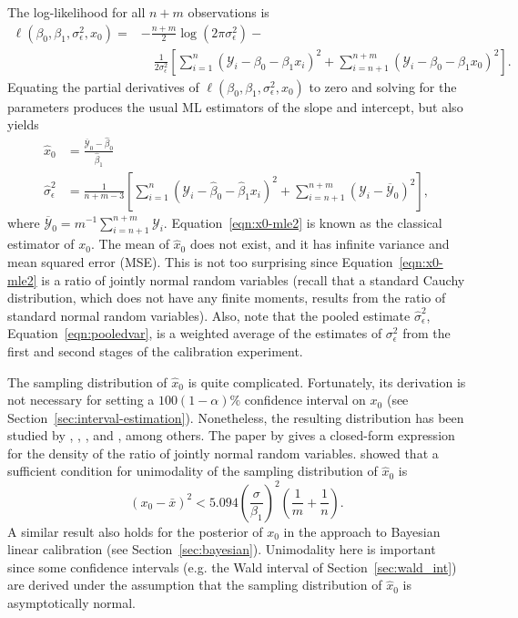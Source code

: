 \documentclass[cmfont,usenames,dvipsnames,leqno]{afit-etd}\usepackage[]{graphicx}\usepackage[]{color}
\newcommand{\mc}[1]{\ensuremath{\mathcal{#1}}}
\newcommand{\wh}[1]{\ensuremath{\widehat{#1}}}
\newcommand{\wb}[1]{\ensuremath{\overline{#1}}}
\begin{document}
The log-likelihood for all $n + m$ observations is
\begin{equation*}
\begin{split}
  \ell\left(\beta_0, \beta_1, \sigma_\epsilon^2, x_0\right) = &-\frac{n+m}{2}\log(2\pi\sigma_\epsilon^2)-\\ &\quad \frac{1}{2\sigma_\epsilon^2}\left[\sum_{i=1}^n(\mc{Y}_i-\beta_0-\beta_1x_i)^2 + \sum_{i=n+1}^{n+m}(\mc{Y}_i-\beta_0-\beta_1x_0)^2\right].
\end{split}
\end{equation*}
Equating the partial derivatives of $\ell\left(\beta_0, \beta_1, \sigma_\epsilon^2, x_0\right)$ to zero and solving for the parameters produces the usual ML estimators of the slope and intercept, but also yields
\begin{align}
  \wh{x}_0 &= \frac{\wb{\mc{Y}}_0-\wh{\beta}_0}{\wh{\beta}_1} \label{eqn:x0-mle2} \\
  \wh{\sigma}_\epsilon^2 &= \frac{1}{n+m-3}\left[\sum_{i=1}^n\left(\mc{Y}_i-\wh{\beta}_0-\wh{\beta}_1 x_i\right)^2 + \sum_{i=n+1}^{n+m}\left(\mc{Y}_i-\wb{\mc{Y}}_0\right)^2\right] \label{eqn:pooledvar},
\end{align}
where $\wb{\mc{Y}}_0 = m^{-1}\sum_{i=n+1}^{n+m}\mc{Y}_i$. Equation~\eqref{eqn:x0-mle2} is known as the classical estimator of $x_0$. The mean of $\wh{x}_0$ does not exist, and it has infinite variance and mean squared error (MSE). This is not too surprising since Equation~\eqref{eqn:x0-mle2} is a ratio of jointly normal random variables (recall that a standard Cauchy distribution, which does not have any finite moments, results from the ratio of standard normal random variables). Also, note that the pooled estimate $\wh{\sigma}_\epsilon^2$, Equation~\eqref{eqn:pooledvar}, is a weighted average of the estimates of $\sigma_\epsilon^2$ from the first and second stages of the calibration experiment. 

The sampling distribution of $\wh{x}_0$ is quite complicated. Fortunately, its derivation is not necessary for setting a $100(1-\alpha)\%$ confidence interval on $x_0$ (see Section~\ref{sec:interval-estimation}). Nonetheless, the resulting distribution has been studied by \citet{fieller_distribution_1932}, \citet{hinkley_ratio_1969}, \citet{buonaccorsi_design_1986}, and \citet{pham-gia_density_2006}, among others. The paper by \citet{pham-gia_density_2006} gives a closed-form expression for the density of the ratio of jointly normal random variables. \citet{buonaccorsi_design_1986} showed that a sufficient condition for unimodality of the sampling distribution of $\wh{x}_0$ is
\begin{equation*}
  (x_0 - \bar{x})^2 < 5.094 \left(\frac{\sigma}{\beta_1}\right)^2 \left( \frac{1}{m} + \frac{1}{n} \right).
\end{equation*}
A similar result also holds for the posterior of $x_0$ in the \citet{hunter_bayesian_1981} approach to Bayesian linear calibration (see Section~\ref{sec:bayesian}). Unimodality here is important since some confidence intervals (e.g. the Wald interval of Section~\ref{sec:wald_int}) are derived under the assumption that the sampling distribution of $\wh{x}_0$ is asymptotically normal. 
\end{document}

